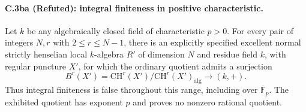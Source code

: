 \paragraph{C.3ba (Refuted): integral finiteness in positive characteristic.}
Let $k$ be any algebraically closed field of characteristic $p>0$.
For every pair of integers $N,r$ with $2\le r\le N-1$, there is
an explicitly specified excellent normal strictly henselian local
$k$-algebra $R'$ of dimension $N$ and residue field $k$, with regular
puncture $X'$, for which the ordinary quotient admits a surjection
\[
 B^r(X')=
 \mathrm{CH}^r(X')/\mathrm{CH}^r(X')_{\mathrm{alg}}
                         \longrightarrow (k,+).
\]
Thus integral finiteness is false throughout this range, including
over $\overline{\mathbb F}_p$. The exhibited quotient has exponent
$p$ and proves no nonzero rational quotient.

